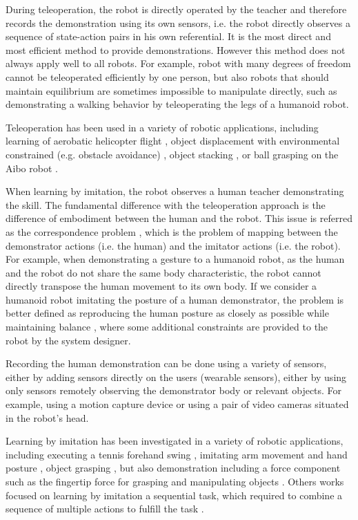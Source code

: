 During teleoperation, the robot is directly operated by the teacher and therefore records the demonstration using its own sensors, i.e. the robot directly observes a sequence of state-action pairs in his own referential. It is the most direct and most efficient method to provide demonstrations. However this method does not always apply well to all robots. For example, robot with many degrees of freedom cannot be teleoperated efficiently by one person, but also robots that should maintain equilibrium are sometimes impossible to manipulate directly, such as demonstrating a walking behavior by teleoperating the legs of a humanoid robot.

Teleoperation has been used in a variety of robotic applications, including learning of aerobatic helicopter flight \cite{abbeel2007application}, object displacement with environmental constrained (e.g. obstacle avoidance) \cite{guenter2007reinforcement,calinon2007teacher}, object stacking \cite{calinon2007teacher}, or ball grasping on the Aibo robot \cite{grollman2007learning}.

When learning by imitation, the robot observes a human teacher demonstrating the skill. The fundamental difference with the teleoperation approach is the difference of embodiment between the human and the robot. This issue is referred as the correspondence problem \cite{nehaniv2002correspondence}, which is the problem of mapping between the demonstrator actions (i.e. the human) and the imitator actions (i.e. the robot). For example, when demonstrating a gesture to a humanoid robot, as the human and the robot do not share the same body characteristic, the robot cannot directly transpose the human movement to its own body. If we consider a humanoid robot imitating the posture of a human demonstrator, the problem is better defined as reproducing the human posture as closely as possible while maintaining balance \cite{hyon2007full,yamane2009simultaneous}, where some additional constraints are provided to the robot by the system designer.

Recording the human demonstration can be done using a variety of sensors, either by adding sensors directly on the users (wearable sensors), either by using only sensors remotely observing the demonstrator body or relevant objects. For example, using a motion capture device or using a pair of video cameras situated in the robot's head.

Learning by imitation has been investigated in a variety of robotic applications, including executing a tennis forehand swing \cite{ijspeert2002movement}, imitating arm movement \cite{billard2001learning} and hand posture \cite{chella2004posture}, object grasping \cite{lopes2005visual,tegin2009demonstration}, but also demonstration including a force component such as the fingertip force for grasping and manipulating objects \cite{lin2012learning}. Others works focused on learning by imitation a sequential task, which required to combine a sequence of multiple actions to fulfill the task \cite{pardowitz2005learning,natarajan2011imitation}.

